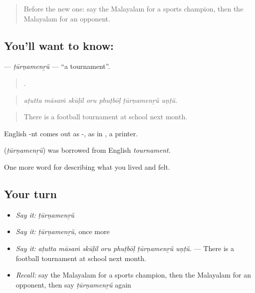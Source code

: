 \label{lesson:ML-C569-turnamenru}



\begin{quote}
Before the new one: say the Malayalam for a sports champion, then the Malayalam for an opponent.
\end{quote}

\subsection*{You'll want to know: }
\textbf{} — \emph{ṭūrṇamenṟŭ} — \textquotedblleft{}a tournament\textquotedblright{}.

\begin{quote}
      .
\end{quote}

\begin{quote}
\emph{aṭutta māsaṁ skūḷil oru phuṭbōḷ ṭūrṇamenṟŭ uṇṭŭ.}
\end{quote}

\begin{quote}
There is a football tournament at school next month.
\end{quote}

English -nt comes out as -, as in , a printer.

\begin{cousinweb}
\textbf{} (\emph{ṭūrṇamenṟŭ}) was borrowed from English \emph{tournament}.
\end{cousinweb}

\begin{grammarlens}[title={What you've built}]
One more word for describing what you lived and felt.
\end{grammarlens}

\subsection*{Your turn}
\begin{itemize}
\raggedright
  \item \emph{Say it:} \emph{ṭūrṇamenṟŭ}
  \item \emph{Say it:} \emph{ṭūrṇamenṟŭ}, once more
  \item \emph{Say it:} \emph{aṭutta māsaṁ skūḷil oru phuṭbōḷ ṭūrṇamenṟŭ uṇṭŭ.} — There is a football tournament at school next month.
  \item \emph{Recall:} say the Malayalam for a sports champion, then the Malayalam for an opponent, then say \emph{ṭūrṇamenṟŭ} again
\end{itemize}

